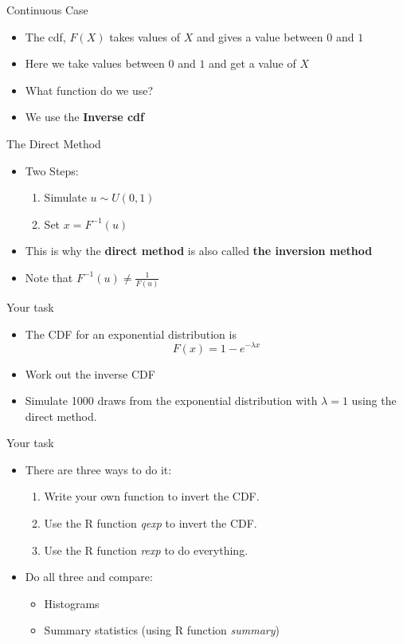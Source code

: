 \documentclass
[handout]
{beamer}
\begin{document}
\begin{frame}{Continuous Case}
\begin{itemize}
\item The cdf, $F(X)$ takes values of $X$ and gives a value between $0$ and $1$
\pause
\item Here we take values between $0$ and $1$ and get a value of $X$
\pause
\item What function do we use?
\pause
\item We use the {\bf Inverse cdf}
\end{itemize}
\end{frame}
\begin{frame}{The Direct Method}
\begin{itemize}
\item Two Steps:
\pause
\begin{enumerate}
\item Simulate $u\sim U(0,1)$
\item Set $x=F^{-1}(u)$
\end{enumerate}
\pause
\item This is why the {\bf direct method} is also called {\bf the inversion method}
\pause
\item Note that $F^{-1}(u)\neq\frac{1}{F(u)}$
\end{itemize}
\end{frame}
\begin{frame}{Your task}
\begin{itemize}
\item The CDF for an exponential distribution is
\begin{equation}
F(x)=1-e^{-\lambda x}
\end{equation}
\pause
\item Work out the inverse CDF
\pause
\item Simulate 1000 draws from the exponential distribution with $\lambda=1$ using the direct method.
\end{itemize}
\end{frame}
\begin{frame}{Your task}
\begin{itemize}
\item There are three ways to do it:
\pause
\begin{enumerate}
\item Write your own function to invert the CDF.
\item Use the R function {\em qexp} to invert the CDF.
\item Use the R function {\em rexp} to do everything.
\end{enumerate}
\pause
\item Do all three and compare:
\pause
\begin{itemize}
\item Histograms
\item Summary statistics (using R function {\em summary})
\end{itemize} 
\end{itemize}
\end{frame}
\end{document}
